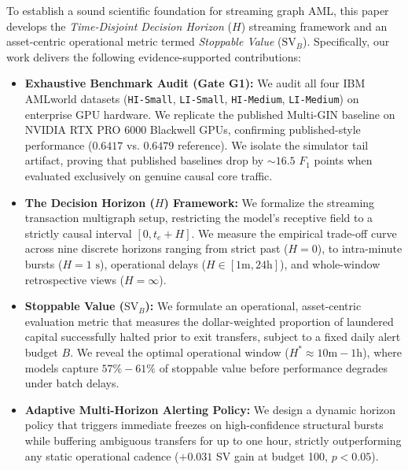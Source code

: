 \documentclass[pdflatex,sn-mathphys,Numbered]{sn-jnl}
\theoremstyle{thmstyleone}
\theoremstyle{thmstyletwo}
\theoremstyle{thmstylethree}
\begin{document}
To establish a sound scientific foundation for streaming graph AML, this paper develops the \emph{Time-Disjoint Decision Horizon} ($H$) streaming framework and an asset-centric operational metric termed \emph{Stoppable Value} ($\text{SV}_B$). Specifically, our work delivers the following evidence-supported contributions:
\begin{itemize}
    \item \textbf{Exhaustive Benchmark Audit (Gate G1):} We audit all four IBM AMLworld datasets (\texttt{HI-Small}, \texttt{LI-Small}, \texttt{HI-Medium}, \texttt{LI-Medium}) on enterprise GPU hardware. We replicate the published Multi-GIN baseline on NVIDIA RTX PRO 6000 Blackwell GPUs, confirming published-style performance ($0.6417$ vs. $0.6479$ reference). We isolate the simulator tail artifact, proving that published baselines drop by $\sim16.5$ $F_1$ points when evaluated exclusively on genuine causal core traffic.
    \item \textbf{The Decision Horizon ($H$) Framework:} We formalize the streaming transaction multigraph setup, restricting the model's receptive field to a strictly causal interval $[0, t_e + H]$. We measure the empirical trade-off curve across nine discrete horizons ranging from strict past ($H=0$), to intra-minute bursts ($H=1\text{ s}$), operational delays ($H\in[1\text{m}, 24\text{h}]$), and whole-window retrospective views ($H=\infty$).
    \item \textbf{Stoppable Value ($\text{SV}_B$):} We formulate an operational, asset-centric evaluation metric that measures the dollar-weighted proportion of laundered capital successfully halted prior to exit transfers, subject to a fixed daily alert budget $B$. We reveal the optimal operational window ($H^* \approx 10\text{m} - 1\text{h}$), where models capture $57\% - 61\%$ of stoppable value before performance degrades under batch delays.
    \item \textbf{Adaptive Multi-Horizon Alerting Policy:} We design a dynamic horizon policy that triggers immediate freezes on high-confidence structural bursts while buffering ambiguous transfers for up to one hour, strictly outperforming any static operational cadence ($+0.031$ SV gain at budget 100, $p < 0.05$).
\end{itemize}
\end{document}
